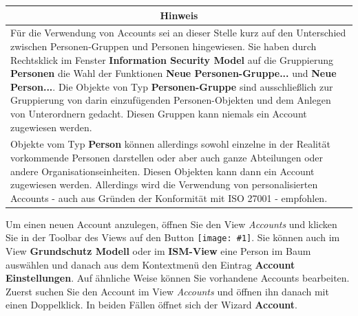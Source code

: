 \documentclass[a4paper,10pt]{book}
\newcommand{\icon}[1]{\texttt{[image: \#1]}}
\begin{document}
\begin{longtable}{| p{} |}
\hline
\multicolumn{1}{|c|}{\textbf{Hinweis}} \\
\hline\hline
 Für die Verwendung von Accounts sei an dieser Stelle kurz auf den Unterschied zwischen Personen-Gruppen und Personen hingewiesen. Sie haben
durch Rechtsklick im Fenster \textbf{Information Security Model} auf die Gruppierung \textbf{Personen} die Wahl der Funktionen
\textbf{Neue Personen-Gruppe...} und \textbf{Neue Person...}. Die Objekte von Typ \textbf{Personen-Gruppe} sind ausschließlich
zur Gruppierung von darin einzufügenden Personen-Objekten und dem Anlegen von Unterordnern gedacht. Diesen Gruppen kann niemals
ein Account zugewiesen werden.
\newline\\
Objekte vom Typ \textbf{Person} können allerdings sowohl einzelne in der Realität vorkommende Personen darstellen oder aber auch ganze Abteilungen oder andere Organisationseinheiten. Diesen Objekten kann dann ein Account zugewiesen werden. Allerdings wird die Verwendung von personalisierten Accounts - auch aus Gründen der Konformität mit ISO 27001 - empfohlen. \\[10pt] \hline
\end{longtable}

Um einen neuen Account anzulegen, öffnen Sie den View \textit{Accounts} und
klicken Sie in der Toolbar des Views auf den Button
\icon{Icon/user_add.png}. Sie können auch im View
\textbf{Grundschutz Modell} oder im \textbf{ISM-View} eine Person im Baum
auswählen und danach aus dem Kontextmenü den Eintrag \textbf{Account
Einstellungen}. Auf ähnliche Weise können Sie vorhandene Accounts bearbeiten.
Zuerst suchen Sie den Account im View \textit{Accounts} und öffnen ihn danach
mit einen Doppelklick. In beiden Fällen öffnet sich der Wizard \textbf{Account}.
\end{document}
